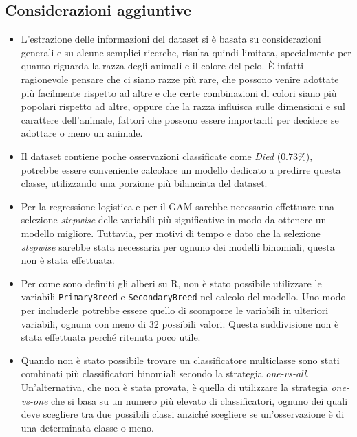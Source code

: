 \subsection{Considerazioni aggiuntive}

\begin{itemize}
	\item L'estrazione delle informazioni del dataset si è basata su considerazioni generali e su alcune semplici ricerche, risulta quindi limitata, specialmente per quanto riguarda la razza degli animali e il colore del pelo. \`E infatti ragionevole pensare che ci siano razze più rare, che possono venire adottate più facilmente rispetto ad altre e che certe combinazioni di colori siano più popolari rispetto ad altre, oppure che la razza influisca sulle dimensioni e sul carattere dell'animale, fattori che possono essere importanti per decidere se adottare o meno un animale. 

	\item Il dataset contiene poche osservazioni classificate come \textit{Died} ($0.73\%$), potrebbe essere conveniente calcolare un modello dedicato a predirre questa classe, utilizzando una porzione più bilanciata del dataset.
	
	\item Per la regressione logistica e per il GAM sarebbe necessario effettuare una selezione \textit{stepwise} delle variabili più significative in modo da ottenere un modello migliore. Tuttavia, per motivi di tempo e dato che la selezione \textit{stepwise} sarebbe stata necessaria per ognuno dei modelli binomiali, questa non è stata effettuata.
	
	\item Per come sono definiti gli alberi su R, non è stato possibile utilizzare le variabili \texttt{PrimaryBreed} e \texttt{SecondaryBreed} nel calcolo del modello. Uno modo per includerle potrebbe essere quello di scomporre le variabili in ulteriori variabili, ognuna con meno di 32 possibili valori. Questa suddivisione non è stata effettuata perché ritenuta poco utile.
	
	\item Quando non è stato possibile trovare un classificatore multiclasse sono stati combinati più classificatori binomiali secondo la strategia \textit{one-vs-all}. 
	Un'alternativa, che non è stata provata, è quella di utilizzare la strategia \textit{one-vs-one} che si basa su un numero più elevato di classificatori, ognuno dei quali deve scegliere tra due possibili classi anziché scegliere se un'osservazione è di una determinata classe o meno.
\end{itemize}
